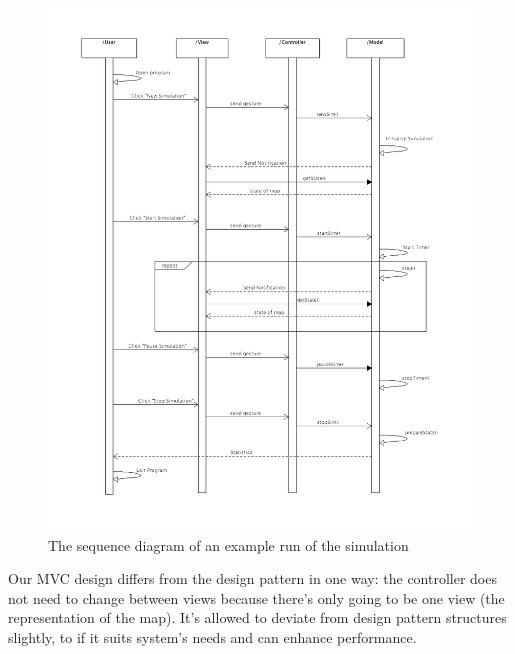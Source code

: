 \documentclass{article}
\begin{document}
   	\begin{figure}
   		\vspace{-35pt}
   		\centering
   		\includegraphics[width=1.15\textwidth]{SequenceDiagram}
   		\caption{The sequence diagram of an example run of the simulation}
   		\label{SequenceDiagram}
   	\end{figure}
   	

%

   Our MVC design differs from the design pattern in one way: the controller does not need to change between views because there’s only going to be one view (the representation of the map). 
   It’s allowed to deviate from design pattern structures slightly, to if it suits system’s needs and can enhance performance. 
   
\end{document}
